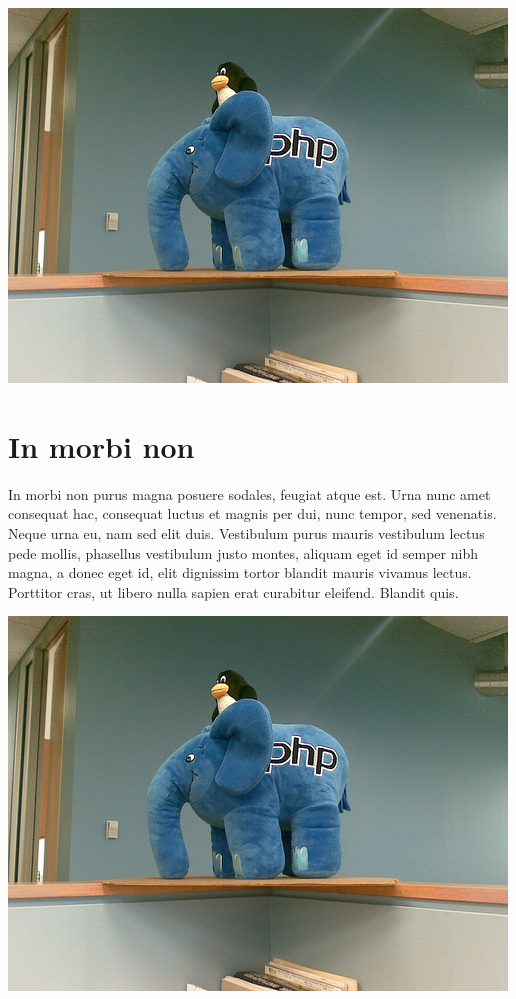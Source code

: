 \documentclass[12pt]{article}
\begin{document}
\includegraphics[scale=0.5]{php}

\section{In morbi non}
In morbi non purus magna posuere sodales, feugiat  atque est. Urna nunc amet consequat hac, consequat luctus et magnis per dui, nunc tempor, sed venenatis. Neque urna eu, nam sed elit duis. Vestibulum purus mauris vestibulum lectus pede mollis, phasellus vestibulum justo montes, aliquam eget id semper nibh magna, a donec eget id, elit dignissim tortor blandit mauris vivamus lectus. Porttitor cras, ut libero nulla sapien erat curabitur eleifend. Blandit quis.


\noindent\includegraphics[width=\textwidth]{php}
\end{document}
